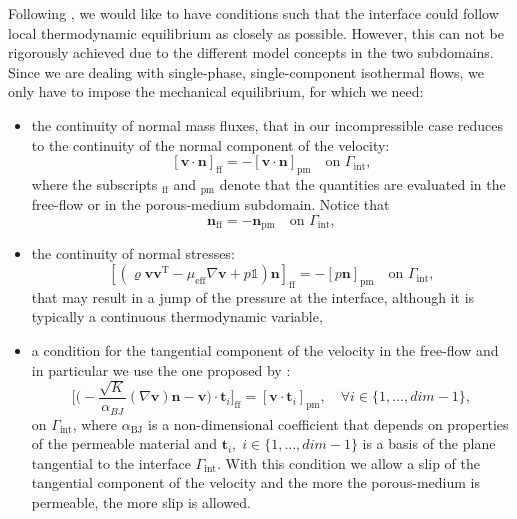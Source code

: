 Following \textcite{paper:mosthaf}, we would like to have conditions such that 
the interface could follow local thermodynamic 
equilibrium as closely as possible. However, this can not be rigorously achieved due to the 
different model concepts in the two subdomains. Since we are dealing with 
single-phase, single-component isothermal flows, we only have to impose the 
mechanical equilibrium, for which we need:
\begin{itemize}
	\item the continuity of normal mass fluxes, that in our incompressible case 
	reduces to the continuity of the normal component of the velocity:
	\begin{equation} \label{eq:contmass}
		[\mathbf{v} \cdot \mathbf{n}]_\text{ff} = - [\mathbf{v} 
		\cdot \mathbf{n}]_\text{pm} \quad \text{on $\Gamma_\text{int}$},
	\end{equation}
	where the subscripts $_\text{ff}$ and $_\text{pm}$ denote that the 
	quantities are 
	evaluated in the free-flow or in the porous-medium subdomain. Notice that
	\begin{equation}
		\mathbf{n}_\text{ff} = -\mathbf{n}_\text{pm} \quad \text{on 
		$\Gamma_\text{int}$},
	\end{equation}
	\item the continuity of normal stresses:
	\begin{equation} \label{eq:coupnormalstress}
		[(\varrho \mathbf{v} \mathbf{v}^\mathrm{T} - \mu_\text{eff} \nabla 
		\mathbf{v} + p\mathbb{1}) 
		\mathbf{n}]_\text{ff} = 
		- [p\mathbf{n}]_\text{pm} \quad \text{on $\Gamma_\text{int}$},
	\end{equation}
	that may result in a jump of the pressure at the interface, although it is typically a continuous thermodynamic variable,
	\item a condition for the tangential component of the velocity in the 
	free-flow and in particular we use the one proposed by \textcite{inter:bj}:
	\begin{equation}
		\bigg[ \bigg( -\frac{\sqrt{K}}{\alpha_{BJ}} (\nabla \mathbf{v}) 
		\mathbf{n} - \mathbf{v} \bigg) \cdot \mathbf{t}_i \bigg]_\text{ff} = 
		[\mathbf{v} \cdot \mathbf{t}_i]_\text{pm}, \quad \forall i \in \{1, 
		\dots, dim - 1\},
	\end{equation}
	on $\Gamma_\text{int}$, where $\alpha_\text{BJ}$ is a non-dimensional 
	coefficient that depends on 
	properties of the permeable material and $\mathbf{t}_i, \; 
	i \in \{1, \dots, dim-1\}$ is a basis of the plane tangential to the 
	interface $\Gamma_\text{int}$. With this condition we allow a slip of the 
	tangential component of the velocity and the more the porous-medium is 
	permeable, the more slip is allowed.
	

\end{itemize}
